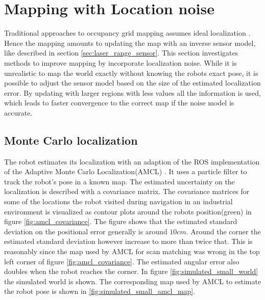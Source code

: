 \section{Mapping with Location noise}
\label{sec:mapping_with_location_noise}

Traditional approaches to occupancy grid mapping assumes ideal localization \cite{probRob}. 
Hence the mapping amounts to updating the map with an inverse sensor model, like described in section \vref{sec:laser_range_sensor}.
This section investigates methods to improve mapping by incorporate localization noise.
While it is unrealistic to map the world exactly without knowing the robots exact pose, it is possible to adjust the sensor model based on the size of the estimated localization error.
By updating with larger regions with less values all the information is used, which leads to faster convergence to the correct map if the noise model is accurate.

\subsection{Monte Carlo localization}
The robot estimates its localization with an adaption of the ROS implementation \cite{ros_amcl} of the Adaptive Monte Carlo Localization(AMCL) \cite{Thrun200199}. It uses a particle filter to track the robot's pose in a known map. 
The estimated uncertainty on the localization is described with a covariance matrix. The covariance matrices for some of the locations the robot visited during navigation in an industrial environment is visualized as contour plots around the robots position(green) in figure \ref{fig:amcl_covariance}. 
The figure shows that the estimated standard deviation on the positional error generally is around $10cm$. Around the corner the estimated standard deviation however increase to more than twice that. This is reasonably since the map used by AMCL for scan matching was wrong in the top left corner of figure \ref{fig:amcl_covariance}. The estimated angular error also doubles when the robot reaches the corner.
In figure \ref{fig:simulated_small_world} the simulated world is shown. The corresponding map used by AMCL to estimate the robot pose is shown in \ref{fig:simulated_small_amcl_map}.

